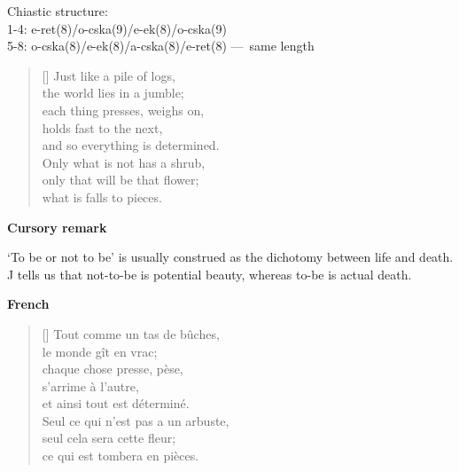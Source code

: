 \documentclass[a4paper,12pt,twoside,final]{book}
\begin{document}
\noindent Chiastic structure: \\
1-4: e-ret(8)/o-cska(9)/e-ek(8)/o-cska(9) \\
5-8: o-cska(8)/e-ek(8)/a-cska(8)/e-ret(8) ---~same length

\newpage


\settowidth{\versewidth}{and so everything is determined.}

\begin{verse}[\versewidth]
  Just like a pile of logs, \\
  the world lies in a jumble; \\
  each thing presses, weighs on, \\
  holds fast to the next, \\
  and so everything is determined. \\
  Only what is not has a shrub, \\
  only that will be that flower; \\
  what is falls to pieces. \\
\end{verse}

\bigskip

\noindent \textbf{Cursory remark}

\medskip

`To be or not to be' is usually construed as the dichotomy between
life and death. J tells us that not-to-be is potential beauty, whereas
to-be is actual death.

\bigskip

\noindent \textbf{French}


\settowidth{\versewidth}{Seul ce qui n'est pas relève de l'arbuste,}

\begin{verse}[\versewidth]
  Tout comme un tas de bûches, \\
  le monde gît en vrac; \\
  chaque chose presse, pèse, \\
  s'arrime à l'autre, \\
  et ainsi tout est déterminé. \\
  Seul ce qui n'est pas a un arbuste, \\
  seul cela sera cette fleur; \\
  ce qui est tombera en pièces. \\
\end{verse}
\end{document}

